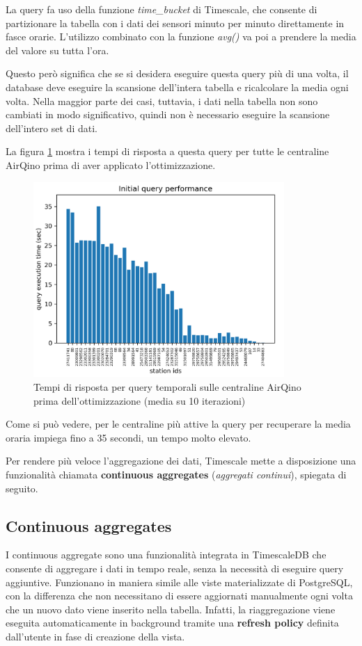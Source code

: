 La query fa uso della funzione \textit{time\_bucket} di Timescale, che consente di partizionare la tabella con i dati dei sensori minuto per minuto direttamente in fasce orarie. L'utilizzo combinato con la funzione \textit{avg()} va poi a prendere la media del valore su tutta l'ora.

Questo però significa che se si desidera eseguire questa query più di una volta, il database deve eseguire la scansione dell'intera tabella e ricalcolare la media ogni volta. Nella maggior parte dei casi, tuttavia, i dati nella tabella non sono cambiati in modo significativo, quindi non è necessario eseguire la scansione dell'intero set di dati.

La figura \ref{fig:query-prima} mostra i tempi di risposta a questa query per tutte le centraline AirQino prima di aver applicato l'ottimizzazione.

\begin{figure}[H]
\centering
\captionsetup{justification=centering}
\includegraphics[width=0.85\textwidth,height=\textheight,keepaspectratio]{img/query_prima}
\caption{Tempi di risposta per query temporali sulle centraline AirQino prima dell'ottimizzazione (media su 10 iterazioni)}
\label{fig:query-prima}
\end{figure}

Come si può vedere, per le centraline più attive la query per recuperare la media oraria impiega fino a 35 secondi, un tempo molto elevato.

Per rendere più veloce l'aggregazione dei dati, Timescale mette a disposizione una funzionalità chiamata \textbf{continuous aggregates} (\textit{aggregati continui}), spiegata di seguito.

\subsection{Continuous aggregates}\label{ssec:cont-aggr}
I continuous aggregate sono una funzionalità integrata in TimescaleDB che consente di aggregare i dati in tempo reale, senza la necessità di eseguire query aggiuntive. Funzionano in maniera simile alle viste materializzate di PostgreSQL, con la differenza che non necessitano di essere aggiornati manualmente ogni volta che un nuovo dato viene inserito nella tabella. Infatti, la riaggregazione viene eseguita automaticamente in background tramite una \textbf{refresh policy} definita dall'utente in fase di creazione della vista.

